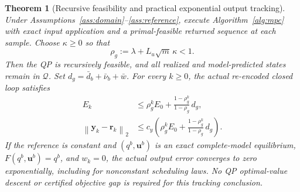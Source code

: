 \documentclass[journal]{IEEEtran}
\theoremstyle{plain}
\newtheorem{theorem}{Theorem}
\theoremstyle{definition}
\newcommand{\vy}{\mathbf{y}}
\newcommand{\vr}{\mathbf{r}}
\newcommand{\vu}{\mathbf{u}}
\newcommand{\norm}[1]{\left\lVert #1\right\rVert}
\begin{document}
\begin{theorem}[Recursive feasibility and practical exponential output tracking]
\label{thm:tracking}
Under Assumptions~\ref{ass:domain}--\ref{ass:reference}, execute Algorithm~\ref{alg:mpc} with exact input application and a \emph{primal-feasible} returned sequence at each sample. Choose $\kappa\ge0$ so that
\begin{equation}
\rho_g:=\lambda+L_u\sqrt m\,\kappa<1.
\label{eq:guard_condition}
\end{equation}
Then the QP is recursively feasible, and all realized and model-predicted states remain in $\mathcal Q$. Set $d_g=\bar d_b+\bar\nu_b+\bar w$. For every $k\ge0$, the \emph{actual re-encoded closed loop} satisfies
\begin{equation}
\begin{split}
E_k&\le\rho_g^k E_0+
\frac{1-\rho_g^k}{1-\rho_g}\,d_g,\\
\norm{\vy_k-\vr_k}_2&\le c_y\left(\rho_g^k E_0+
\frac{1-\rho_g^k}{1-\rho_g}\,d_g\right).
\end{split}
\label{eq:practical_tracking}
\end{equation}
If the reference is constant and $(q^b,\vu^b)$ is an exact complete-model equilibrium, $F(q^b,\vu^b)=q^b$, and $w_k=0$, the actual output error converges to zero exponentially, including for nonconstant scheduling laws. No QP optimal-value descent or certified objective gap is required for this tracking conclusion.
\end{theorem}
\end{document}
